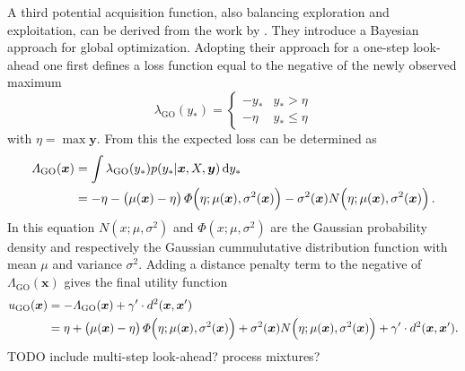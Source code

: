 \documentclass[11pt,a4paper,twoside,BCOR=15mm]{scrreprt}
\newcommand{\vc}[1]{\bm{#1}}
\newcommand{\ped}[1]{_{\mathrm{#1}}}
\begin{document}
A third potential acquisition function, also balancing exploration and 
exploitation, can be derived from the work by \textcite{Osborne:2009tn}. They 
introduce a Bayesian approach for global optimization. Adopting their approach 
for a one-step look-ahead one first defines a loss function equal to the 
negative of the newly observed maximum
\begin{equation}
    \lambda\ped{GO} (y_*) = \left\{ \begin{array}{ll}-y_* & y_* > \eta \\ -\eta 
            & y_* \leq \eta \end{array} \right.
\end{equation}
with $\eta = \max \vc y$. From this the expected loss can be determined as
\begin{equation}\begin{split}
    \varLambda\ped{GO}(\vc x) &= \int \lambda\ped{GO}(y_*) p(y_* | \vc x, X, \vc 
    y) \dif y_* \\
    &= -\eta - \del{\mu(\vc x) - \eta} \varPhi\!\del{\eta; \mu(\vc x), 
        \sigma^2(\vc x)} - \sigma^2(\vc x) N\!\del{\eta; \mu(\vc x), 
        \sigma^2(\vc x)}
    \text{.}
\end{split}\end{equation}
In this equation $N(x; \mu, \sigma^2)$ and $\varPhi(x; \mu, \sigma^2)$ are the 
Gaussian probability density and respectively the Gaussian cummulutative 
distribution function with mean $\mu$ and variance $\sigma^2$. Adding a distance 
penalty term to the negative of $\varLambda\ped{GO}(\vc x)$ gives the final 
utility function
\begin{equation}\begin{split}
    u\ped{GO}(\vc x) &= -\varLambda\ped{GO}(\vc x) + \gamma' \cdot d^2(\vc x, 
    \vc x') \\
    &= \eta + \del{\mu(\vc x) - \eta} \varPhi\!\del{\eta; \mu(\vc x), 
        \sigma^2(\vc x)} + \sigma^2(\vc x) N\!\del{\eta; \mu(\vc x), 
        \sigma^2(\vc x)} + \gamma' \cdot d^2(\vc x, \vc x')
    \text{.}
\end{split}\end{equation}
TODO include multi-step look-ahead? process mixtures?
\end{document}
